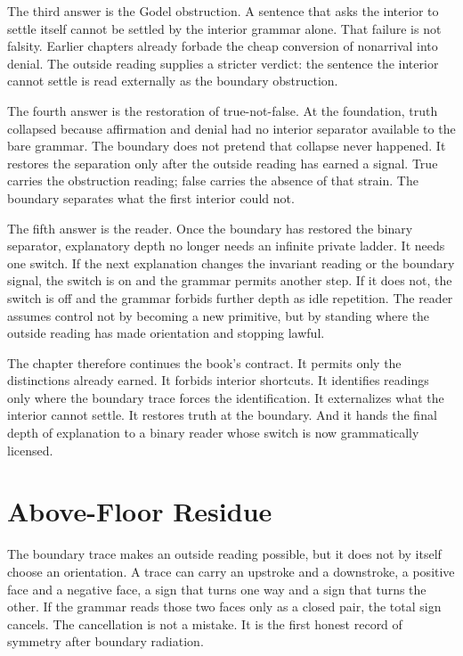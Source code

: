 The third answer is the Godel obstruction. A sentence that asks the interior
to settle itself cannot be settled by the interior grammar alone. That
failure is not falsity. Earlier chapters already forbade the cheap conversion
of nonarrival into denial. The outside reading supplies a stricter verdict:
the sentence the interior cannot settle is read externally as the boundary
obstruction.

The fourth answer is the restoration of true-not-false. At the foundation,
truth collapsed because affirmation and denial had no interior separator
available to the bare grammar. The boundary does not pretend that collapse
never happened. It restores the separation only after the outside reading has
earned a signal. True carries the obstruction reading; false carries the
absence of that strain. The boundary separates what the first interior could
not.

The fifth answer is the reader. Once the boundary has restored the binary
separator, explanatory depth no longer needs an infinite private ladder. It
needs one switch. If the next explanation changes the invariant reading or
the boundary signal, the switch is on and the grammar permits another step.
If it does not, the switch is off and the grammar forbids further depth as
idle repetition. The reader assumes control not by becoming a new primitive,
but by standing where the outside reading has made orientation and stopping
lawful.

The chapter therefore continues the book's contract. It permits only the
distinctions already earned. It forbids interior shortcuts. It identifies
readings only where the boundary trace forces the identification. It
externalizes what the interior cannot settle. It restores truth at the
boundary. And it hands the final depth of explanation to a binary reader
whose switch is now grammatically licensed.

\section{Above-Floor Residue}

The boundary trace makes an outside reading possible, but it does not by
itself choose an orientation. A trace can carry an upstroke and a downstroke,
a positive face and a negative face, a sign that turns one way and a sign
that turns the other. If the grammar reads those two faces only as a closed
pair, the total sign cancels. The cancellation is not a mistake. It is the
first honest record of symmetry after boundary radiation.

